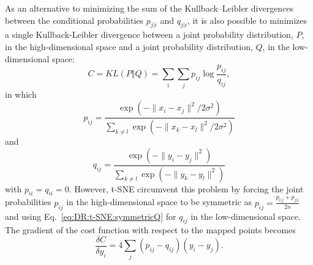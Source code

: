 As an alternative to minimizing the sum of the Kullback--Leibler divergences between the conditional probabilities $p_{j|i}$ and $q_{j|i}$, it is also possible to minimizes a single Kullback-Leibler divergence between a joint probability distribution, $P$, in the high-dimensional space and a joint probability distribution, $Q$, in the low-dimensional space:
\begin{equation}
	C=KL(P\Vert Q)=\sum_i\sum_j p_{ij}\log \frac{p_{ij}}{q_{ij}},
\end{equation}
in which
\begin{equation}
	p_{ij}=\frac{\exp{\left(-\lVert x_i-x_j\rVert^2/2\sigma^2\right)}}{\sum_{k\neq l}\exp{\left(-\lVert x_k-x_l\rVert^2/2\sigma^2\right)}}
\end{equation}
and
\begin{equation}
	q_{ij}=\frac{\exp{\left(-\lVert y_i-y_j\rVert^2\right)}}{\sum_{k\neq l}\exp{\left(-\lVert y_k-y_l\rVert^2\right)}}
	\label{eq:DR:t-SNE:symmetricQ}
\end{equation}
with $p_{ii}=q_{ii}=0$. However, t-SNE circumvent this problem by forcing the joint probabilities $p_{ij}$ in the high-dimensional space to be symmetric as $p_{ij}=\frac{p_{i|j}+p_{j|i}}{2n}$ and using Eq.~\ref{eq:DR:t-SNE:symmetricQ} for $q_{ij}$ in the low-dimensional space. The gradient of the cost function with respect to the mapped points becomes
\begin{equation}
	\frac{\delta C}{\delta y_i}=4\sum_j(p_{ij}-q_{ij})(y_i-y_j).
\end{equation}
